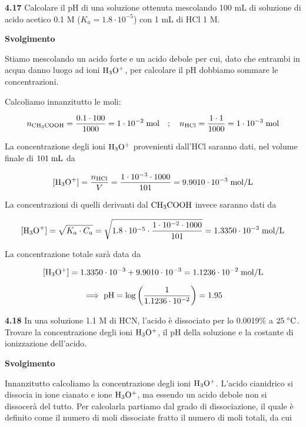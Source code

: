 \vspace{0.2cm}\textbf{4.17} Calcolare il pH di una soluzione ottenuta mescolando 100 mL di soluzione di acido acetico 0.1 M ($K_a=1.8 \cdot 10^{-5}$) con 1 mL di HCl 1 M.

\vspace{0.2cm}\large\textbf{Svolgimento}\normalsize

\vspace{0.2cm}Stiamo mescolando un acido forte e un acido debole per cui, dato che entrambi in acqua danno luogo ad ioni $\rm H_3O^+$, per calcolare il pH dobbiamo sommare le concentrazioni.

Calcoliamo innanzitutto le moli:

$$n_{\rm CH_3COOH}=\frac{0.1 \cdot 100}{1000}=1 \cdot 10^{-2} \; \text{mol}
\quad;\quad
n_{\rm HCl}=\frac{1 \cdot 1}{1000}=1 \cdot 10^{-3} \; \rm mol$$

La concentrazione degli ioni $\rm H_3O^+$ provenienti dall'HCl saranno dati, nel volume finale di $101 \; \rm mL$ da

$$[\text{H}_3\text{O}^+]=\frac{n_{\rm HCl}}{V}
=\frac{1 \cdot 10^{-3} \cdot 1000}{101}
=9.9010\cdot 10^{-3} \; \rm mol/L$$

La concentrazioni di quelli derivanti dal $\rm CH_3COOH$ invece saranno dati da

$$[\text{H}_3\text{O}^+]=\sqrt{K_a \cdot C_a}
=\sqrt{1.8 \cdot 10^{-5}\cdot \frac{1 \cdot 10^{-2} \cdot 1000}{101}}
=1.3350 \cdot 10^{-3} \; \rm mol/L$$

La concentrazione totale sarà data da

$$[\rm H_3O^+]=1.3350 \cdot 10^{-3} + 9.9010\cdot 10^{-3}
=1.1236 \cdot 10^{-2} \; \rm mol/L$$

$$\implies
\rm pH=\log{\left(\frac{1}{1.1236 \cdot 10^{-2}}\right)}
=1.95$$

\vspace{0.2cm}\textbf{4.18} In una soluzione 1.1 M di HCN, l'acido è dissociato per lo 0.0019\% a $25 \; ^{\circ} \rm C$. Trovare la concentrazione degli ioni $\rm H_3O^+$, il pH della soluzione e la costante di ionizzazione dell'acido.

\vspace{0.2cm}\large\textbf{Svolgimento}\normalsize

\vspace{0.2cm}Innanzitutto calcoliamo la concentrazione degli ioni $\rm H_3O^+$. L'acido cianidrico si dissocia in ione cianato e ione $\rm H_3O^+$, ma essendo un acido debole non si dissocerà del tutto. Per calcolarla partiamo dal grado di dissociazione, il quale è definito come il numero di moli dissociate fratto il numero di moli totali, da cui

